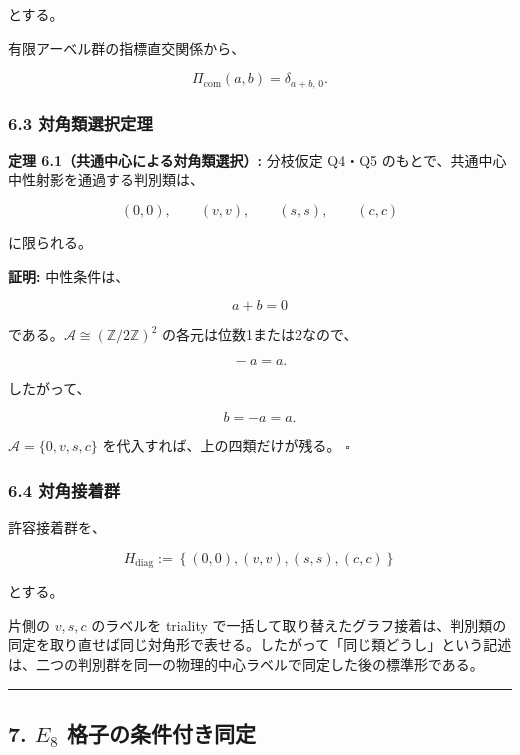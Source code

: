 \documentclass[
  a4paper,
  ja=minimal,
  xelatex,
  paragraph-mark={},
]{bxjsarticle}
\begin{document}
とする。

有限アーベル群の指標直交関係から、

\[
\Pi_{\mathrm{com}}(a,b)
{}=
\delta_{a+b,\,0}.
\]

\subsubsection{6.3
対角類選択定理}\label{ux5bfeux89d2ux985eux9078ux629eux5b9aux7406}

\textbf{定理 6.1（共通中心による対角類選択）:} 分枝仮定 Q4・Q5
のもとで、共通中心中性射影を通過する判別類は、

\[
\boxed{
(0,0),
\qquad
(v,v),
\qquad
(s,s),
\qquad
(c,c)
}
\]

に限られる。

\textbf{証明:} 中性条件は、

\[
a+b=0
\]

である。\(\mathcal A\cong(\mathbb Z/2\mathbb Z)^2\)
の各元は位数1または2なので、

\[
{}-a=a.
\]

したがって、

\[
b=-a=a.
\]

\(\mathcal A=\{0,v,s,c\}\) を代入すれば、上の四類だけが残る。
\(\square\)

\subsubsection{6.4 対角接着群}\label{ux5bfeux89d2ux63a5ux7740ux7fa4}

許容接着群を、

\[
H_{\mathrm{diag}}
:=
\left\{
(0,0),
(v,v),
(s,s),
(c,c)
\right\}
\]

とする。

片側の \(v,s,c\) のラベルを triality
で一括して取り替えたグラフ接着は、判別類の同定を取り直せば同じ対角形で表せる。したがって「同じ類どうし」という記述は、二つの判別群を同一の物理的中心ラベルで同定した後の標準形である。

\begin{center}\rule{0.5\linewidth}{0.5pt}\end{center}

\subsection{\texorpdfstring{7. \(E_8\)
格子の条件付き同定}{7. E\_8 格子の条件付き同定}}\label{e_8-ux683cux5b50ux306eux6761ux4ef6ux4ed8ux304dux540cux5b9a}
\end{document}
